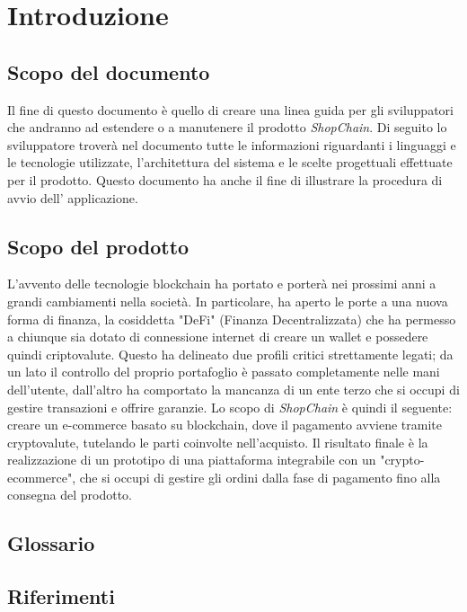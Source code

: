 

\section{Introduzione} \label{section:introduzione}
\subsection{Scopo del documento}
Il fine di questo documento è quello di creare una linea guida per gli sviluppatori che andranno ad estendere o a manutenere il prodotto \textit{ShopChain}.
Di seguito lo sviluppatore troverà nel documento tutte le informazioni riguardanti i linguaggi e le tecnologie utilizzate, l'architettura del sistema e le scelte progettuali effettuate per il prodotto.
Questo documento ha anche il fine di illustrare la procedura di avvio dell' applicazione.
\subsection{Scopo del prodotto}
L'avvento delle tecnologie blockchain\glo{} ha portato e porterà nei prossimi anni a grandi cambiamenti nella società.
In particolare, ha aperto le porte a una nuova forma di finanza, la cosiddetta "DeFi" (Finanza Decentralizzata) che ha permesso a chiunque sia dotato di connessione internet di creare un wallet\glo{} e possedere quindi criptovalute\glo{}.
Questo ha delineato due profili critici strettamente legati; da un lato il controllo del proprio portafoglio è passato completamente nelle mani dell'utente, dall'altro ha comportato la mancanza di un ente terzo che si occupi di gestire transazioni e offrire garanzie.
\newline
Lo scopo di \textit{ShopChain} è quindi il seguente: creare un e-commerce\glo{} basato su blockchain\glo{}, dove il pagamento avviene tramite cryptovalute\glo{}, tutelando le parti coinvolte nell'acquisto.
\newline
Il risultato finale è la realizzazione di un prototipo di una piattaforma integrabile con un "crypto-ecommerce\glo{}", che si occupi di gestire gli ordini dalla fase di pagamento fino alla consegna del prodotto.

\subsection{Glossario}
\gloDesc{}
\subsection{Riferimenti}
